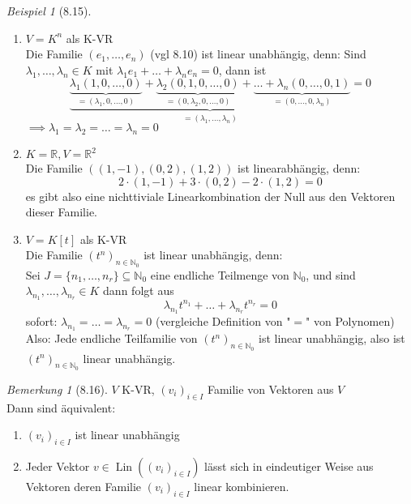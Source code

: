 \documentclass[a4paper]{scrartcl}
\DeclareMathOperator{\Lin}{Lin}
\theoremstyle{definition}
\theoremstyle{plain}
\theoremstyle{plain}
\theoremstyle{remark}
\newtheorem{remark}{Bemerkung}
\theoremstyle{remark}
\theoremstyle{remark}
\theoremstyle{remark}
\theoremstyle{remark}
\newtheorem{ex}{Beispiel}
\begin{document}
\begin{ex}[8.15]
\mbox{}
\begin{enumerate}
\item $V = K^n$ als K-VR \\
     Die Familie $(e_1, \ldots, e_n)$ (vgl 8.10) ist linear unabhängig, denn:
Sind $\lambda_1, \ldots, \lambda_n \in K$ mit $\lambda_1 e_1 + \ldots + \lambda_n e_n = 0$, dann ist
\[\underbrace{\underbrace{\lambda_1 (1, 0, \ldots, 0)}_{=(\lambda_1, 0, \ldots, 0)} + \underbrace{\lambda_2 (0, 1, 0, \ldots, 0)}_{= (0, \lambda_2, 0, \ldots, 0)} + \underbrace{\ldots + \lambda_n (0, \ldots, 0, 1)}_{=(0,\ldots,0,\lambda_n)}}_{= (\lambda_1, \ldots, \lambda_n)} = 0\]
$\implies \lambda_1 = \lambda_2 = \ldots = \lambda_n = 0$
\item $K = \mathbb{R}, V = \mathbb{R}^2$ \\
     Die Familie $((1, -1), (0,2), (1,2))$ ist linearabhängig, denn:
\[2\cdot(1,-1) + 3\cdot(0,2) - 2\cdot(1,2) = 0\]
es gibt also eine nichttiviale Linearkombination der Null aus den Vektoren dieser Familie.
\item $V = K[t]$ als K-VR \\
     Die Familie $(t^n)_{n\in \mathbb{N}_0}$ ist linear unabhängig, denn: \\
     Sei $J = \{n_1, \ldots, n_r\} \subseteq \mathbb{N}_0$ eine endliche Teilmenge von $\mathbb{N}_0$, und sind $\lambda_{n_1}, \ldots, \lambda_{n_r} \in K$
dann folgt aus
\[\lambda_{n_1}t^{n_1} + \ldots + \lambda_{n_r} t^{n_r} = 0\]
sofort: $\lambda_{n_1} = \ldots = \lambda_{n_r} = 0$ (vergleiche Definition von "$=$" von Polynomen)
Also: Jede endliche Teilfamilie von $(t^n)_{n\in\mathbb{N}_0}$ ist linear unabhängig, also ist $(t^n)_{n\in\mathbb{N}_0}$ linear unabhängig.
\end{enumerate}
\end{ex}
\begin{remark}[8.16]
$V$ K-VR, $(v_i)_{i\in I}$ Familie von Vektoren aus $V$ \\
  Dann sind äquivalent:
\begin{enumerate}
\item $(v_i)_{i \in I}$ ist linear unabhängig
\item Jeder Vektor $v \in \Lin((v_i)_{i\in I})$ lässt sich in eindeutiger Weise aus Vektoren deren Familie $(v_i)_{i\in I}$ linear kombinieren.
\end{enumerate}
\end{remark}
\end{document}
